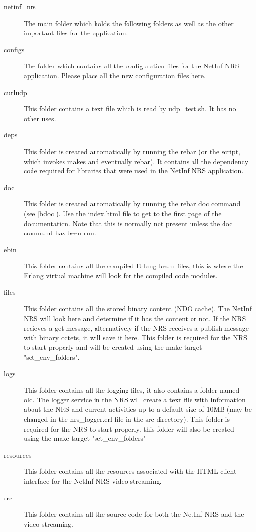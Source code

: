 \begin{description}
\item [netinf\_nrs]
The main folder which holds the following folders as well as the other important files for the application.
\item [configs]
The folder which contains all the configuration files for the NetInf NRS application. Please place all the new configuration files here. 
\item [curludp]
This folder contains a text file which is read by udp\_test.sh. It has no other uses.
\item [deps]
This folder is created automatically by running the rebar (or the script, which invokes makes and eventually rebar). 
It contains all the dependency code required for libraries that were used in the NetInf NRS application. 
\item [doc]
This folder is created automatically by running the rebar doc command (see \ref{bdoc}). Use the index.html file to get to 
the first page of the documentation. Note that this is normally not present unless the doc command has been run.
\item [ebin]
This folder contains all the compiled Erlang beam files, this is where the Erlang virtual machine will look for the compiled code modules.
\item [files]
This folder contains all the stored binary content (NDO cache). The NetInf NRS will look here and determine if it has the content 
or not. If the NRS recieves a get message, alternatively if the NRS receives a publish message with binary octets, it will save it here. 
This folder is required for the NRS to start properly and will be created using the make target "set\_env\_folders".
\item [logs]
This folder contains all the logging files, it also contains a folder named old. The logger service in the NRS will create a text file 
with information about the NRS and current activities up to a default size of 10MB (may be changed in the nrs\_logger.erl file 
in the src directory). This folder is required for the NRS to start properly, this folder will also be created using the make target "set\_env\_folders"
\item [resources]
This folder contains all the resources associated with the HTML client interface for the NetInf NRS video streaming.
\item [src]
This folder contains all the source code for both the NetInf NRS and the video streaming.
\end{description}

